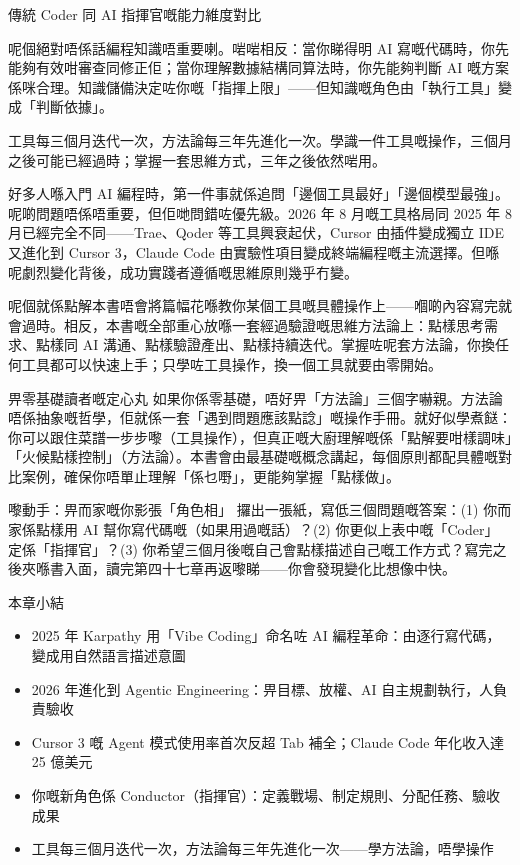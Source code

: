 \begin{center}\small\color{gray}傳統 Coder 同 AI 指揮官嘅能力維度對比\end{center}

呢個絕對唔係話編程知識唔重要喇。啱啱相反：當你睇得明 AI 寫嘅代碼時，你先能夠有效咁審查同修正佢；當你理解數據結構同算法時，你先能夠判斷 AI 嘅方案係咪合理。知識儲備決定咗你嘅「指揮上限」——但知識嘅角色由「執行工具」變成「判斷依據」。


工具每三個月迭代一次，方法論每三年先進化一次。學識一件工具嘅操作，三個月之後可能已經過時；掌握一套思維方式，三年之後依然啱用。

好多人喺入門 AI 編程時，第一件事就係追問「邊個工具最好」「邊個模型最強」。呢啲問題唔係唔重要，但佢哋問錯咗優先級。2026 年 8 月嘅工具格局同 2025 年 8 月已經完全不同——Trae、Qoder 等工具興衰起伏，Cursor 由插件變成獨立 IDE 又進化到 Cursor 3，Claude Code 由實驗性項目變成終端編程嘅主流選擇。但喺呢劇烈變化背後，成功實踐者遵循嘅思維原則幾乎冇變。

呢個就係點解本書唔會將篇幅花喺教你某個工具嘅具體操作上——嗰啲內容寫完就會過時。相反，本書嘅全部重心放喺一套經過驗證嘅思維方法論上：點樣思考需求、點樣同 AI 溝通、點樣驗證產出、點樣持續迭代。掌握咗呢套方法論，你換任何工具都可以快速上手；只學咗工具操作，換一個工具就要由零開始。

\begin{tcbinfo}{畀零基礎讀者嘅定心丸}
如果你係零基礎，唔好畀「方法論」三個字嚇親。方法論唔係抽象嘅哲學，佢就係一套「遇到問題應該點諗」嘅操作手冊。就好似學煮餸：你可以跟住菜譜一步步嚟（工具操作），但真正嘅大廚理解嘅係「點解要咁樣調味」「火候點樣控制」（方法論）。本書會由最基礎嘅概念講起，每個原則都配具體嘅對比案例，確保你唔單止理解「係乜嘢」，更能夠掌握「點樣做」。

\end{tcbinfo}

\begin{tcbpractice}{嚟動手：畀而家嘅你影張「角色相」}
攞出一張紙，寫低三個問題嘅答案：(1) 你而家係點樣用 AI 幫你寫代碼嘅（如果用過嘅話）？(2) 你更似上表中嘅「Coder」定係「指揮官」？(3) 你希望三個月後嘅自己會點樣描述自己嘅工作方式？寫完之後夾喺書入面，讀完第四十七章再返嚟睇——你會發現變化比想像中快。

\end{tcbpractice}

\begin{tcbsummary}{本章小結}
\begin{itemize}
  \item 2025 年 Karpathy 用「Vibe Coding」命名咗 AI 編程革命：由逐行寫代碼，變成用自然語言描述意圖
  \item 2026 年進化到 Agentic Engineering：畀目標、放權、AI 自主規劃執行，人負責驗收
  \item Cursor 3 嘅 Agent 模式使用率首次反超 Tab 補全；Claude Code 年化收入達 25 億美元
  \item 你嘅新角色係 Conductor（指揮官）：定義戰場、制定規則、分配任務、驗收成果
  \item 工具每三個月迭代一次，方法論每三年先進化一次——學方法論，唔學操作
\end{itemize}

\end{tcbsummary}
